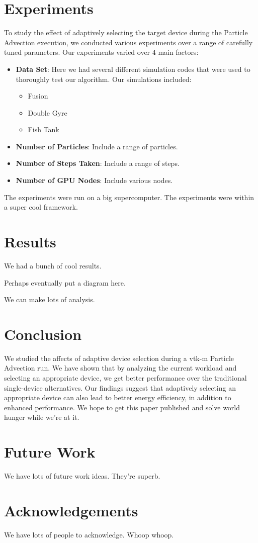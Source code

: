 \documentclass{IEEEtran}
\begin{document}
\section{Experiments}
To study the effect of adaptively selecting the target device during the Particle Advection execution, we conducted various experiments over a range of carefully tuned parameters.
%
Our experiments varied over 4 main factors:
%
\begin{itemize}
\item \textbf{Data Set}: Here we had several different simulation codes that were used to thoroughly test our algorithm. Our simulations included:
%
\begin{itemize}
\item{Fusion}
\item{Double Gyre}
\item{Fish Tank}
\end{itemize}
%
\item \textbf{Number of Particles}: Include a range of particles.
\item \textbf{Number of Steps Taken}: Include a range of steps.
\item \textbf{Number of GPU Nodes}: Include various nodes.
\end{itemize}
%
The experiments were run on a big supercomputer. 
%
The experiments were within a super cool framework.
%
\section{Results}
We had a bunch of cool results.
\begin{center}
 Perhaps eventually put a diagram here.
\end{center}
We can make lots of analysis.
%
\section{Conclusion}
We studied the affects of adaptive device selection during a vtk-m Particle Advection run. 
%
We have shown that by analyzing the current workload and selecting an appropriate device, we get better performance over the traditional single-device alternatives. 
%
Our findings suggest that adaptively selecting an appropriate device can also lead to better energy efficiency, in addition to enhanced performance. 
%
We hope to get this paper published and solve world hunger while we're at it.
%
\section{Future Work}
We have lots of future work ideas. 
%
They're superb.
%
\section{Acknowledgements}
We have lots of people to acknowledge. 
%
Whoop whoop.
%
\end{document}
